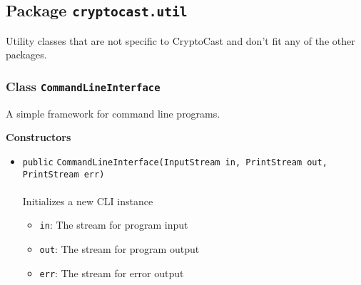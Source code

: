 \subsection{Package \lstinline!cryptocast.util!}
Utility classes that are not specific to CryptoCast and don't fit any of the other packages.
\subsubsection{Class \lstinline|CommandLineInterface|}
A simple framework for command line programs. \\
\noindent\begin{minipage}[t]{5cm}
\vspace{0.3em}
\hspace*{2em}
\vspace{0.3em}
\end{minipage}




\textbf{\sffamily Constructors}
\begin{itemize}
\item \lstinline|public| \lstinline|CommandLineInterface|\lstinline|(InputStream in, PrintStream out, PrintStream err)|\\ \\[-0.6em]
Initializes a new CLI instance
\begin{itemize}
\item \lstinline|in|: The stream for program input
\item \lstinline|out|: The stream for program output
\item \lstinline|err|: The stream for error output
\end{itemize}



\end{itemize}


